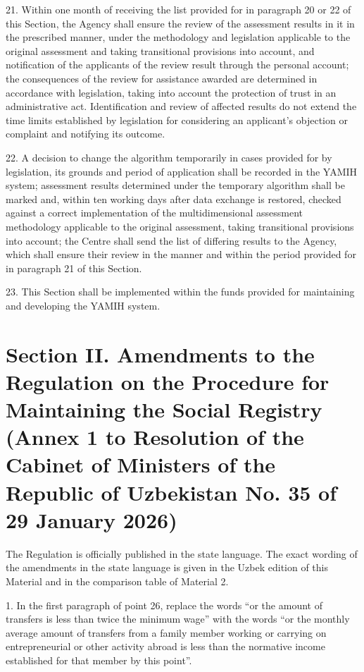 \documentclass[14pt,a4paper]{extarticle}
\newcommand{\norm}[1]{\par\noindent\hspace*{1.27cm}#1. }
\begin{document}
\norm{21}Within one month of receiving the list provided for in paragraph 20 or 22 of this Section, the Agency shall ensure the review of the assessment results in it in the prescribed manner, under the methodology and legislation applicable to the original assessment and taking transitional provisions into account, and notification of the applicants of the review result through the personal account; the consequences of the review for assistance awarded are determined in accordance with legislation, taking into account the protection of trust in an administrative act. Identification and review of affected results do not extend the time limits established by legislation for considering an applicant’s objection or complaint and notifying its outcome.

\norm{22}A decision to change the algorithm temporarily in cases provided for by legislation, its grounds and period of application shall be recorded in the YAMIH system; assessment results determined under the temporary algorithm shall be marked and, within ten working days after data exchange is restored, checked against a correct implementation of the multidimensional assessment methodology applicable to the original assessment, taking transitional provisions into account; the Centre shall send the list of differing results to the Agency, which shall ensure their review in the manner and within the period provided for in paragraph 21 of this Section.

\norm{23}This Section shall be implemented within the funds provided for maintaining and developing the YAMIH system.

\section*{Section II. Amendments to the Regulation on the Procedure for Maintaining the Social Registry (Annex 1 to Resolution of the Cabinet of Ministers of the Republic of Uzbekistan No. 35 of 29 January 2026)}

The Regulation is officially published in the state language. The exact wording of the amendments in the state language is given in the Uzbek edition of this Material and in the comparison table of Material 2.

\norm{1}In the first paragraph of point 26, replace the words “or the amount of transfers is less than twice the minimum wage” with the words “or the monthly average amount of transfers from a family member working or carrying on entrepreneurial or other activity abroad is less than the normative income established for that member by this point”.
\end{document}
